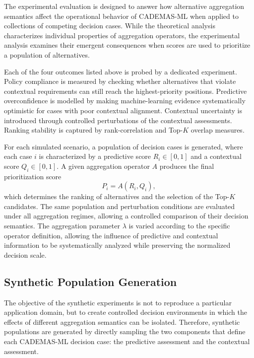\documentclass[mathematics,article,submit,moreauthors]{Definitions/mdpi}
\begin{document}
The experimental evaluation is designed to answer how alternative
aggregation semantics affect the operational behavior of CADEMAS-ML when
applied to collections of competing decision cases. While the theoretical
analysis characterizes individual properties of aggregation operators,
the experimental analysis examines their emergent consequences when
scores are used to prioritize a population of alternatives.

{\color{teal}Each of the four outcomes listed above is probed by a
dedicated experiment. Policy compliance is measured by checking whether
alternatives that violate contextual requirements can still reach the
highest-priority positions. Predictive overconfidence is modelled by making
machine-learning evidence systematically optimistic for cases with poor
contextual alignment. Contextual uncertainty is introduced through
controlled perturbations of the contextual assessments. Ranking stability
is captured by rank-correlation and Top-$K$ overlap measures.}

For each simulated scenario, a population of decision cases is generated,
where each case $i$ is characterized by a predictive score
$R_i\in[0,1]$ and a contextual score $Q_i\in[0,1]$. A given aggregation
operator $A$ produces the final prioritization score
\[
P_i=A(R_i,Q_i),
\]
which determines the ranking of alternatives and the selection of the
Top-$K$ candidates. The same population and perturbation conditions are
evaluated under all aggregation regimes, allowing a controlled
comparison of their decision semantics. The aggregation parameter $\lambda$ is varied according to the specific operator definition, allowing the influence of predictive and contextual information to be systematically analyzed while preserving the normalized decision scale.


\subsection{Synthetic Population Generation}
\label{subsec:synthetic-population}

The objective of the synthetic experiments is not to reproduce a
particular application domain, but to create controlled decision
environments in which the effects of different aggregation semantics can
be isolated. Therefore, synthetic populations are generated by directly
sampling the two components that define each CADEMAS-ML decision case:
the predictive assessment and the contextual assessment.
\end{document}
